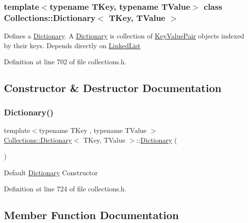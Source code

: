 \subsubsection*{template$<$typename T\+Key, typename T\+Value$>$\newline
class Collections\+::\+Dictionary$<$ T\+Key, T\+Value $>$}

Defines a \hyperlink{class_collections_1_1_dictionary}{Dictionary}. A \hyperlink{class_collections_1_1_dictionary}{Dictionary} is collection of \hyperlink{class_collections_1_1_key_value_pair}{Key\+Value\+Pair} objects indexed by their keys. Depends directly on \hyperlink{class_collections_1_1_linked_list}{Linked\+List} 

Definition at line 702 of file collections.\+h.



\subsection{Constructor \& Destructor Documentation}
\hypertarget{class_collections_1_1_dictionary_a772de3b4b0a38cfbc18f84fb249364b8}{}\label{class_collections_1_1_dictionary_a772de3b4b0a38cfbc18f84fb249364b8} 
\subsubsection{\texorpdfstring{Dictionary()}{Dictionary()}}
{\footnotesize\ttfamily template$<$typename T\+Key , typename T\+Value $>$ \\
\hyperlink{class_collections_1_1_dictionary}{Collections\+::\+Dictionary}$<$ T\+Key, T\+Value $>$\+::\hyperlink{class_collections_1_1_dictionary}{Dictionary} (\begin{DoxyParamCaption}{ }\end{DoxyParamCaption})}

Default \hyperlink{class_collections_1_1_dictionary}{Dictionary} Constructor 

Definition at line 724 of file collections.\+h.



\subsection{Member Function Documentation}
\hypertarget{class_collections_1_1_dictionary_a097c05648ba47cb5da4f81fbffd047f4}{}\label{class_collections_1_1_dictionary_a097c05648ba47cb5da4f81fbffd047f4} 
